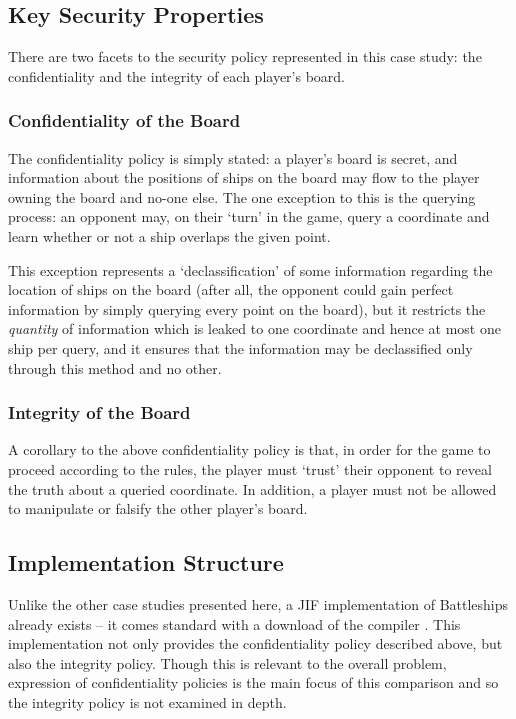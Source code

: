 \newpage

\subsection{Key Security Properties}

There are two facets to the security policy represented in this case study: the confidentiality and the integrity of each player's board.

\subsubsection{Confidentiality of the Board}

The confidentiality policy is simply stated: a player's board is secret, and information about the positions of ships on the board may flow to the player owning the board and no-one else. The one exception to this is the querying process: an opponent may, on their `turn' in the game, query a coordinate and learn whether or not a ship overlaps the given point.

This exception represents a `declassification' of some information regarding the location of ships on the board (after all, the opponent could gain perfect information by simply querying every point on the board), but it restricts the \textit{quantity} of information which is leaked to one coordinate and hence at most one ship per query, and it ensures that the information may be declassified only through this method and no other.

\subsubsection{Integrity of the Board}

A corollary to the above confidentiality policy is that, in order for the game to proceed according to the rules, the player must `trust' their opponent to reveal the truth about a queried coordinate. In addition, a player must not be allowed to manipulate or falsify the other player's board.

\subsection{Implementation Structure}\label{battleships_impstructure}

Unlike the other case studies presented here, a JIF implementation of Battleships already exists -- it comes standard with a download of the compiler \cite{jifwebsite}. This implementation not only provides the confidentiality policy described above, but also the integrity policy. Though this is relevant to the overall problem, expression of confidentiality policies is the main focus of this comparison and so the integrity policy is not examined in depth.

